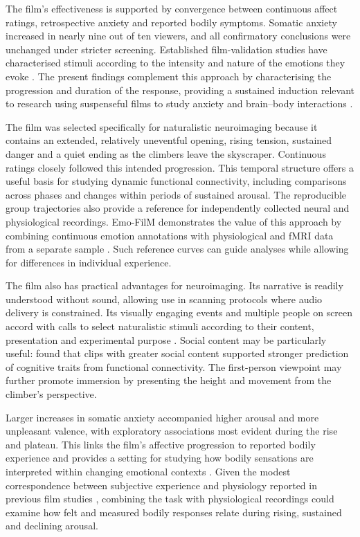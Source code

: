 \documentclass[man,12pt,british]{apa7}
\begin{document}
The film's effectiveness is supported by convergence between continuous affect ratings, retrospective anxiety and
reported bodily symptoms. Somatic anxiety increased in nearly nine out of ten viewers, and all confirmatory
conclusions were unchanged under stricter screening. Established film-validation studies have characterised stimuli
according to the intensity and nature of the emotions they evoke \parencite{gross1995emotion,schaefer2010assessing}.
The present findings complement this approach by characterising the progression and duration of the response,
providing a sustained induction relevant to research using suspenseful films to study anxiety and brain--body
interactions \parencite{kirk2024brainheart}.

The film was selected specifically for naturalistic neuroimaging because it contains an extended, relatively
uneventful opening, rising tension, sustained danger and a quiet ending as the climbers leave the skyscraper.
Continuous ratings closely followed this intended progression. This temporal structure offers a useful basis for
studying dynamic functional connectivity, including comparisons across phases and changes within periods of
sustained arousal. The reproducible group trajectories also provide a reference for independently collected neural
and physiological recordings. Emo-FilM demonstrates the value of this approach by combining continuous emotion
annotations with physiological and fMRI data from a separate sample \parencite{morgenroth2025emofilm}. Such
reference curves can guide analyses while allowing for differences in individual experience.

The film also has practical advantages for neuroimaging. Its narrative is readily understood without sound, allowing
use in scanning protocols where audio delivery is constrained. Its visually engaging events and multiple people on
screen accord with calls to select naturalistic stimuli according to their content, presentation and experimental
purpose \parencite{grall2022leveraging}. Social content may be particularly useful: \textcite{finn2021movie} found
that clips with greater social content supported stronger prediction of cognitive traits from functional
connectivity. The first-person viewpoint may further promote immersion by presenting the height and movement from
the climber's perspective.

Larger increases in somatic anxiety accompanied higher arousal and more unpleasant valence, with exploratory
associations most evident during the rise and plateau. This links the film's affective progression to reported
bodily experience and provides a setting for studying how bodily sensations are interpreted within changing
emotional contexts \parencite{cristaldi2026beyond}. Given the modest correspondence between subjective experience
and physiology reported in previous film studies \parencite{mauss2005tie}, combining the task with physiological
recordings could examine how felt and measured bodily responses relate during rising, sustained and declining
arousal.
\end{document}
